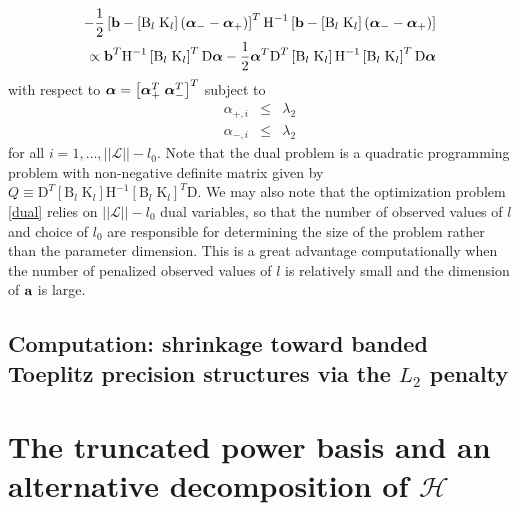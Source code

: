 \documentclass[12pt]{article}
\newcommand{\bfalpha}{\mbox{\boldmath $\alpha$}}
\newcommand{\bfa}{\mbox{\bf a}}
\newcommand{\bfb}{\mbox{\bf b}}
\newcommand{\matK}{\mbox{K}}
\newcommand{\matH}{\mbox{H}}
\newcommand{\matB}{\mbox{B}}
\newcommand{\matD}{\mbox{D}}
\begin{document}
\begin{eqnarray}
  -\frac{1}{2}\left[ \bfb - \left[\matB_l\;\matK_l\right]\left(\bfalpha_- -\bfalpha_+  \right) \right]^T\matH^{-1} \left[ \bfb - \left[\matB_l\;\matK_l\right]\left(\bfalpha_- -\bfalpha_+  \right) \right] \\
  \propto  \bfb^T\matH^{-1}\left[\matB_l\;\matK_l \right]^T\matD \bfalpha - \frac{1}{2}\bfalpha^T\matD^T \left[\matB_l\;\matK_l \right] \matH^{-1}\left[\matB_l\;\matK_l \right]^T\matD\bfalpha \label{dual}
\end{eqnarray} \noindent
with respect to $\bfalpha = \left[ \bfalpha_+^T\;\bfalpha_-^T \right]^T$ subject to
\begin{eqnarray}
\alpha_{+,i} &\le& \lambda_2\\
\alpha_{-,i} &\le& \lambda_2
\end{eqnarray}
\noindent
for all $i = 1,\dots, \vert \vert \mathcal{L}\vert \vert - l_0$. Note that the dual problem is a quadratic programming problem with non-negative definite matrix given by $Q \equiv \matD^T \left[\matB_l\;\matK_l \right] \matH^{-1}\left[\matB_l\;\matK_l \right]^T\matD$. We may also note that the optimization problem \eqref{dual} relies on $\vert \vert \mathcal{L}\vert \vert - l_0$ dual variables, so that the number of observed values of $l$ and choice of $l_0$ are responsible for determining the size of the problem rather than the parameter dimension. This is a great advantage computationally when the number of penalized observed values of $l$ is relatively small and the dimension of $\bfa$ is large. 

\subsection{Computation: shrinkage toward banded Toeplitz precision structures via the $L_2$ penalty}

\section{The truncated power basis and an alternative decomposition of $\mathcal{H}$}
\end{document}
